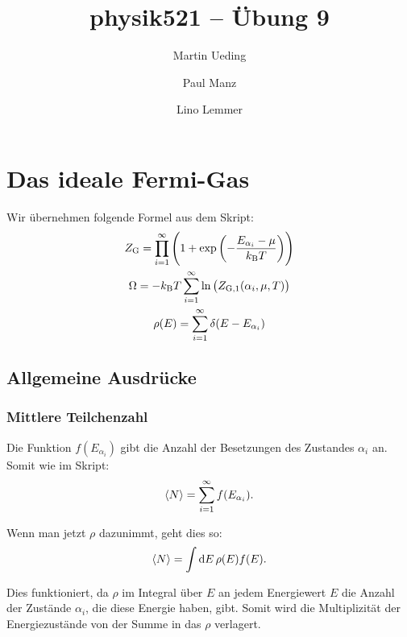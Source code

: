 

\hypersetup{
	pdftitle=
}

\title{physik521 -- Übung 9}
\author{
	Martin Ueding 
        \and
        Paul Manz
        \and
        Lino Lemmer
}



\maketitle

\section{Das ideale Fermi-Gas}

\newcommand\kB{k_\text B}
\newcommand\ZG{Z_\text G}
\newcommand\ZGe{Z_{\text G, 1}}
\newcommand\Eai{E_{\alpha_i}}
\newcommand\isum{\sum_{i=1}^\infty }

Wir übernehmen folgende Formel aus dem Skript:
\begin{gather*}
    \ZG = \prod_{i=1}^\infty \del{1 + \exp\del{- \frac{\Eai - \mu}{\kB T}}} \\
    \Omega = - \kB T \isum \ln \del{\ZGe(\alpha_i, \mu, T)} \\
    \rho(E) = \isum \delta(E - \Eai)
\end{gather*}

\subsection{Allgemeine Ausdrücke}

\subsubsection{Mittlere Teilchenzahl}

Die Funktion $f(\Eai)$ gibt die Anzahl der Besetzungen des Zustandes $\alpha_i$ an. Somit wie im Skript:
\[
    \bracket N = \isum f(\Eai).
\]

Wenn man jetzt $\rho$ dazunimmt, geht dies so:
\[
    \bracket N = \int \dif E \, \rho(E) f(E).
\]

Dies funktioniert, da $\rho$ im Integral über $E$ an jedem Energiewert $E$ die
Anzahl der Zustände $\alpha_i$, die diese Energie haben, gibt. Somit wird die
Multiplizität der Energiezustände von der Summe in das $\rho$ verlagert.

\IfFileExists{\bibliographyfile}{
    \printbibliography
}{}



